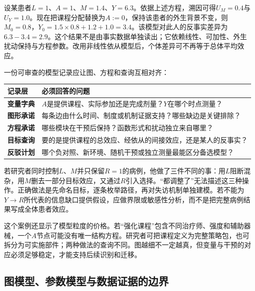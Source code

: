 \begin{workedexample}[从事实到个体反事实]
设某患者$L=1$、$A=1$、$M=1.4$、$Y=6.3$。依据上述方程，溯因可得$U_M=0.4$与$U_Y=1.0$。现在把课程分配替换为$A:=0$，保持该患者的外生背景不变，则$M_0=0.8$，$Y_0=1.5\times0.8+1.2+1.0=3.4$。该模型对此人的反事实差异为$6.3-3.4=2.9$。这个结果不是由事实数据单独读出；它依赖线性、可加性、外生扰动保持与方程参数。改用非线性依从模型后，个体差异可不再等于总体平均效应。
\end{workedexample}

一份可审查的模型记录应让图、方程和查询互相对齐：

\begin{center}
\small
\begin{tabularx}{\textwidth}{>{\bfseries}p{2.2cm}X}
\toprule
记录层 & 必须回答的问题\\
\midrule
变量字典 & $A$是提供课程、实际参加还是完成剂量？$Y$在哪个时点测量？\\
图形承诺 & 每条边由什么时间、制度或机制证据支持？哪些缺边是关键排除？\\
方程承诺 & 哪些模块在干预后保持？函数形式和扰动独立来自哪里？\\
目标查询 & 要的是提供课程的总效应、经依从的间接效应，还是某人的反事实？\\
反驳计划 & 哪个负对照、新环境、随机干预或独立测量最能区分备选模型？\\
\bottomrule
\end{tabularx}
\end{center}

\begin{failurecheck}[把可见变量全部放入回归]
若研究者同时控制$L$、$M$并只保留$R=1$的病例，他做了三件不同的事：用$L$阻断混杂，用$M$删去一部分目标效应，又通过$R$引入选择。“都调整了”无法描述这三种操作。正确做法是先命名目标，逐条枚举路径，再对失访机制单独建模。若不能为$Y\rightarrow R$所代表的信息缺口提供假设，应做界限或敏感性分析，而不是把完整病例结果写成全体患者效应。
\end{failurecheck}

这个案例还显示了模型粒度的价格。若“强化课程”包含不同治疗师、强度和辅助器械，一个$A$节点可能没有唯一结构方程。研究者可把课程定义为完整策略包，也可拆分为可实施部件；两种做法的查询不同。图越细不一定越真，但变量与干预的对应必须足够稳定，才能支持后续识别和迁移。

\subsection{图模型、参数模型与数据证据的边界}

